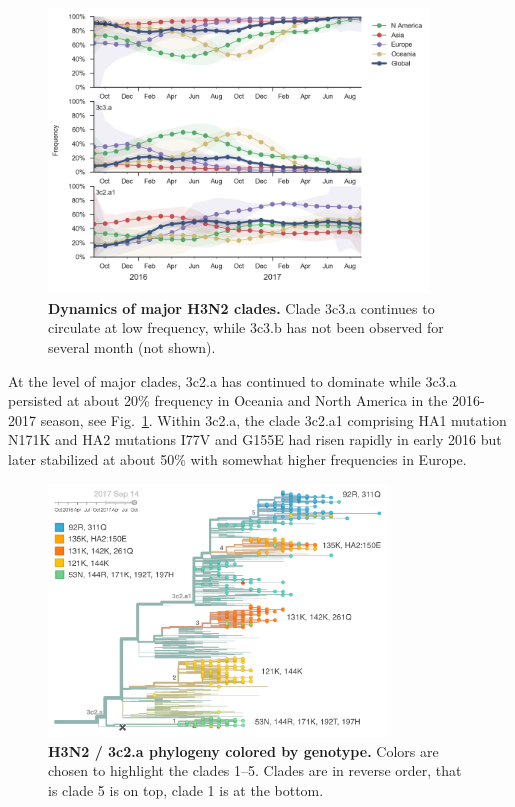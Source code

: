 \documentclass[11pt,oneside,letterpaper]{article}
\newcommand{\FIG}[1]{Fig.~\ref{#1}}
\begin{document}
\clearpage
\begin{figure}[H]
  \centering
  \includegraphics[width=0.9\textwidth]{../figures/sep-2017/h3n2_clades.png}
  \caption{\textbf{Dynamics of major H3N2 clades.} Clade 3c3.a continues to circulate at low frequency, while 3c3.b has not been observed for several month (not shown).}
  \label{H3N2_clades}
\end{figure}
At the level of major clades, 3c2.a has continued to dominate while
3c3.a persisted at about 20\% frequency in Oceania and North America in
the 2016-2017 season, see \FIG{H3N2_clades}. Within 3c2.a, the clade 3c2.a1 comprising HA1
mutation N171K and HA2 mutations I77V and G155E had risen rapidly in
early 2016 but later stabilized at about 50\% with somewhat higher
frequencies in Europe.

\clearpage
\begin{figure}[H]
  \centering
  \includegraphics[width=0.8\textwidth]{../figures/sep-2017/h3n2_tree.png}
  \caption{\textbf{H3N2 / 3c2.a phylogeny colored by genotype.} Colors are chosen to highlight the clades 1--5. Clades are in reverse order, that is clade 5 is on top, clade 1 is at the bottom.
  }
  \label{H3N2_tree}
\end{figure}
\end{document}
